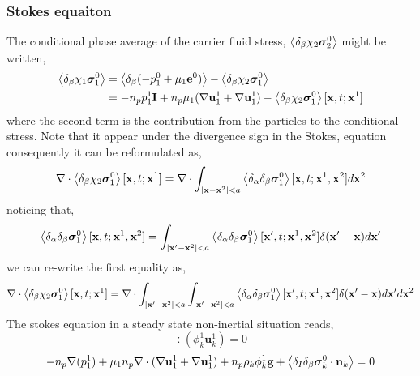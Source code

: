 \subsubsection*{Stokes equaiton}
The conditional phase average of the carrier fluid stress, $\left<\delta_\beta\chi_2 \bm\sigma_2^0\right>$ might be written,
\begin{align*}
    \left<\delta_\beta\chi_1 \bm\sigma_1^0\right>
    &= 
    \left<\delta_\beta (-p_1^0 + \mu_1 \textbf{e}^0 )\right>
    - \left<\delta_\beta\chi_2 \bm\sigma_1^0\right>\\
    &= 
    - n_p p_1^1 \textbf{I}
    + n_p \mu_1 (\mathbf{\nabla} \textbf{u}_1^1 + \mathbf{\nabla} \textbf{u}_1^1)
    - \left<\delta_\beta\chi_2 \bm\sigma_1^0\right>[\textbf{x},t;\textbf{x}^1]\\
\end{align*}
where the second term is the contribution from the particles to the conditional stress. 
Note that it appear under the divergence sign in the Stokes, equation consequently it can be reformulated as\citet{hinch1977averaged}, 
\begin{equation*}
    \mathbf{\nabla}\cdot \left<\delta_\beta\chi_2 \bm\sigma_1^0\right>[\textbf{x},t;\textbf{x}^1]
    =\mathbf{\nabla}\cdot\int_{|\textbf{x}-\textbf{x}^2| < a}
    \left<\delta_\alpha\delta_\beta \bm\sigma_1^0\right>[\textbf{x},t;\textbf{x}^1,\textbf{x}^2] d\textbf{x}^2
\end{equation*}
noticing that, 
\begin{equation*}
    \left<\delta_\alpha\delta_\beta \bm\sigma_1^0\right>[\textbf{x},t;\textbf{x}^1,\textbf{x}^2]
    = \int_{|\textbf{x}'-\textbf{x}^2|<a}
    \left<\delta_\alpha\delta_\beta \bm\sigma_1^0\right>[\textbf{x}',t;\textbf{x}^1,\textbf{x}^2]
    \delta(\textbf{x}' - \textbf{x})
    d\textbf{x}'
\end{equation*}
we can re-write the first equality as, 
\begin{equation*}
    \mathbf{\nabla}\cdot \left<\delta_\beta\chi_2 \bm\sigma_1^0\right>[\textbf{x},t;\textbf{x}^1]
    =\mathbf{\nabla}\cdot
    \int_{|\textbf{x}'-\textbf{x}^2|<a}
    \int_{|\textbf{x}'-\textbf{x}^2|<a}
    \left<\delta_\alpha\delta_\beta \bm\sigma_1^0\right>[\textbf{x}',t;\textbf{x}^1,\textbf{x}^2]
    \delta(\textbf{x}' - \textbf{x})
    d\textbf{x}'
    d\textbf{x}^2
\end{equation*}
The stokes equation in a steady state non-inertial situation reads, 
\begin{equation}
    \div (\phi_k^1\textbf{u}_k^1)
    = 0
\end{equation}
\begin{equation}
    - n_p \mathbf{\nabla} (p_1^1)
    + \mu_1n_p \mathbf{\nabla}\cdot (\mathbf{\nabla} \textbf{u}_1^1 + \mathbf{\nabla} \textbf{u}_1^1)
    + n_p  \rho_k \phi_k^1 \textbf{g} 
    + \left<\delta_I\delta_\beta \bm\sigma_k^0 \cdot \textbf{n}_k\right>
    = 0 
\end{equation}
